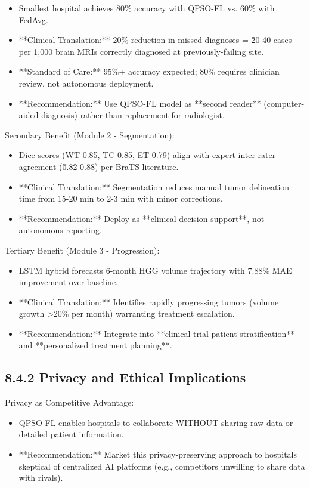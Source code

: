 \begin{itemize}
  \item Smallest hospital achieves 80\% accuracy with QPSO-FL vs. 60\% with FedAvg.
  \item **Clinical Translation:** 20\% reduction in missed diagnoses = \~20-40 cases per 1,000 brain MRIs correctly diagnosed at previously-failing site.
  \item **Standard of Care:** 95\%+ accuracy expected; 80\% requires clinician review, not autonomous deployment.
  \item **Recommendation:** Use QPSO-FL model as **second reader** (computer-aided diagnosis) rather than replacement for radiologist.
\end{itemize}

Secondary Benefit (Module 2 - Segmentation):

\begin{itemize}
  \item Dice scores (WT 0.85, TC 0.85, ET 0.79) align with expert inter-rater agreement (\~0.82-0.88) per BraTS literature.
  \item **Clinical Translation:** Segmentation reduces manual tumor delineation time from 15-20 min to 2-3 min with minor corrections.
  \item **Recommendation:** Deploy as **clinical decision support**, not autonomous reporting.
\end{itemize}

Tertiary Benefit (Module 3 - Progression):

\begin{itemize}
  \item LSTM hybrid forecasts 6-month HGG volume trajectory with 7.88\% MAE improvement over baseline.
  \item **Clinical Translation:** Identifies rapidly progressing tumors (volume growth >20\% per month) warranting treatment escalation.
  \item **Recommendation:** Integrate into **clinical trial patient stratification** and **personalized treatment planning**.
\end{itemize}


\subsection{8.4.2 Privacy and Ethical Implications}
Privacy as Competitive Advantage:

\begin{itemize}
  \item QPSO-FL enables hospitals to collaborate WITHOUT sharing raw data or detailed patient information.
  \item **Recommendation:** Market this privacy-preserving approach to hospitals skeptical of centralized AI platforms (e.g., competitors unwilling to share data with rivals).
\end{itemize}

